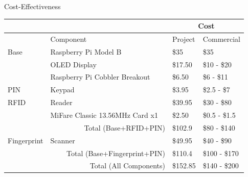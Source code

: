\begin{frame}{Cost-Effectiveness}
\begin{table}[h]
	\centering
	\begin{threeparttable}
	\begin{tabular}{lll|l|l|}
	\cline{4-5}
	 &  &  & \multicolumn{2}{c|}{Cost} \\ \hline
	\multicolumn{1}{|l|}{} & \scriptsize{Component} & & \scriptsize{Project} & \scriptsize{Commercial} \\ \hline
	\multicolumn{1}{|l|}{Base} & \scriptsize{Raspberry Pi Model B} &  & \scriptsize{\$35} & \scriptsize{\$35} \\
	\multicolumn{1}{|l|}{} & \scriptsize{OLED Display} &  & \scriptsize{\$17.50} & \scriptsize{\$10 - \$20} \\
	\multicolumn{1}{|l|}{} & \scriptsize{Raspberry Pi Cobbler Breakout} &  & \scriptsize{\$6.50} & \scriptsize{\$6 - \$11} \\ \hline
	\multicolumn{1}{|l|}{PIN} & \scriptsize{Keypad} &  & \scriptsize{\$3.95} & \scriptsize{\$2.5 - \$7} \\ \hline
	\multicolumn{1}{|l|}{RFID} & \scriptsize{Reader} &  & \scriptsize{\$39.95} & \scriptsize{\$30 - \$80} \\
	\multicolumn{1}{|l|}{} & \scriptsize{MiFare Classic 13.56MHz Card x1} &  & \scriptsize{\$2.50} & \scriptsize{\$0.5 - \$1.5} \\
	\multicolumn{1}{|l|}{} & \multicolumn{2}{r|}{\scriptsize{Total (Base+RFID+PIN)}} & \scriptsize{\$102.9} & \scriptsize{\$80 - \$140} \\ \hline
	\multicolumn{1}{|l|}{Fingerprint} & \scriptsize{Scanner} &  & \scriptsize{\$49.95} & \scriptsize{\$40 - \$90} \\
	\multicolumn{1}{|l|}{} & \multicolumn{2}{r|}{\scriptsize{Total (Base+Fingerprint+PIN)}} & \scriptsize{\$110.4} & \scriptsize{\$100 - \$170} \\ \hline
	\multicolumn{1}{|l|}{} & \multicolumn{2}{r|}{\scriptsize{Total (All Components)}} & \scriptsize{\$152.85} & \scriptsize{\$140 - \$200} \\ \hline
	\end{tabular}
	\end{threeparttable}
	\end{table}

\end{frame}